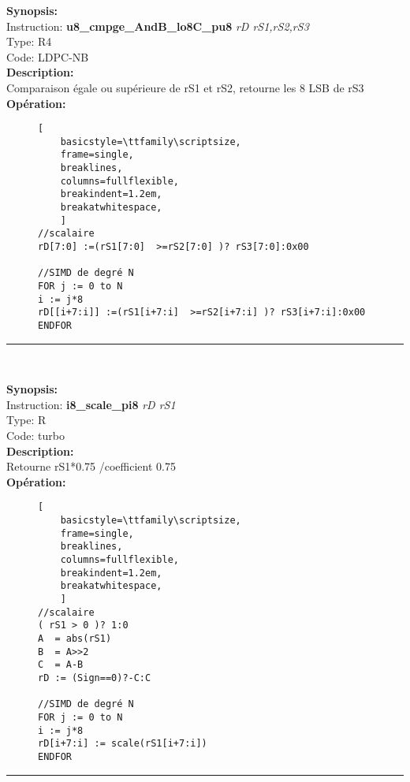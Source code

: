 {\scriptsize
\textbf{Synopsis:}\\
Instruction: \textbf{u8\_cmpge\_AndB\_lo8C\_pu8 } \textit{rD rS1,rS2,rS3}\\
Type: R4\\
Code: LDPC-NB\\
\textbf{Description:}\\
Comparaison égale ou supérieure de rS1 et rS2, retourne les 8 LSB de rS3 \\
\textbf{Opération:}\\
    \begin{figure}[H]
    \begin{lstlisting}[
    basicstyle=\ttfamily\scriptsize,
    frame=single,
    breaklines,
    columns=fullflexible,
    breakindent=1.2em,
    breakatwhitespace,
    ]
//scalaire
rD[7:0] :=(rS1[7:0]  >=rS2[7:0] )? rS3[7:0]:0x00
    
//SIMD de degré N
FOR j := 0 to N  
i := j*8  
rD[[i+7:i]] :=(rS1[i+7:i]  >=rS2[i+7:i] )? rS3[i+7:i]:0x00
ENDFOR
\end{lstlisting}
\end{figure}
}
\rule{8cm}{0.4pt}\\
{\scriptsize
\textbf{Synopsis:}\\
Instruction: \textbf{i8\_scale\_pi8 } \textit{rD rS1}\\
Type: R\\
Code: turbo\\
\textbf{Description:}\\
Retourne rS1*0.75 /coefficient 0.75\\
\textbf{Opération:}\\
    \begin{figure}[H]
    \begin{lstlisting}[
    basicstyle=\ttfamily\scriptsize,
    frame=single,
    breaklines,
    columns=fullflexible,
    breakindent=1.2em,
    breakatwhitespace,
    ]
//scalaire
( rS1 > 0 )? 1:0  
A  = abs(rS1) 
B  = A>>2 
C  = A-B   
rD := (Sign==0)?-C:C 
    
//SIMD de degré N
FOR j := 0 to N  
i := j*8  
rD[i+7:i] := scale(rS1[i+7:i]) 
ENDFOR 
\end{lstlisting}
\end{figure}
}
\rule{8cm}{0.4pt}\\
